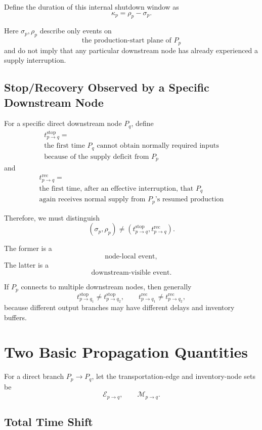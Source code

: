\documentclass[11pt]{article}
\begin{document}
Define the duration of this internal shutdown window as
\[
\boxed{
\kappa_p=\rho_p-\sigma_p.
}
\]

Here \(\sigma_p,\rho_p\) describe only events on
\[
\boxed{\text{the production-start plane of \(P_p\)}}
\]
and do not imply that any particular downstream node has already experienced a supply interruption.

\subsection{Stop/Recovery Observed by a Specific Downstream Node}

For a specific direct downstream node \(P_q\), define
\[
\boxed{\begin{gathered}
t_{p\to q}^{\mathrm{stop}}=\\
\text{the first time \(P_q\) cannot obtain normally required inputs}\\
\text{because of the supply deficit from \(P_p\)}
\end{gathered}}
\]
and
\[
\boxed{\begin{gathered}
t_{p\to q}^{\mathrm{rec}}=\\
\text{the first time, after an effective interruption, that \(P_q\)}\\
\text{again receives normal supply from \(P_p\)'s resumed production}
\end{gathered}}
\]

Therefore, we must distinguish
\[
\boxed{
(\sigma_p,\rho_p)
\neq
(t_{p\to q}^{\mathrm{stop}},t_{p\to q}^{\mathrm{rec}}).
}
\]

The former is a
\[
\text{node-local event},
\]
The latter is a
\[
\text{downstream-visible event}.
\]

If \(P_p\) connects to multiple downstream nodes, then generally
\[
t_{p\to q_1}^{\mathrm{stop}}
\neq
t_{p\to q_2}^{\mathrm{stop}},
\qquad
t_{p\to q_1}^{\mathrm{rec}}
\neq
t_{p\to q_2}^{\mathrm{rec}},
\]
because different output branches may have different delays and inventory buffers.

\section{Two Basic Propagation Quantities}

For a direct branch \(P_p\to P_q\), let the transportation-edge and inventory-node sets be
\[
\mathcal E_{p\to q},
\qquad
\mathcal M_{p\to q}.
\]

\subsection{Total Time Shift}
\end{document}
